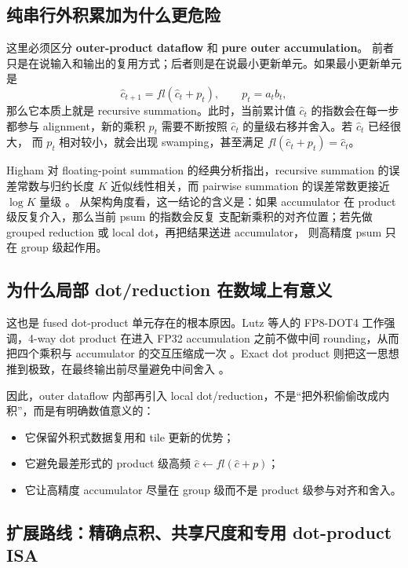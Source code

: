 \documentclass[UTF8,11pt,a4paper]{ctexart}
\begin{document}
\subsection{纯串行外积累加为什么更危险}

这里必须区分 \textbf{outer-product dataflow} 和 \textbf{pure outer accumulation}。
前者只是在说输入和输出的复用方式；后者则是在说最小更新单元。如果最小更新单元是
\begin{equation}
  \hat{c}_{t+1} = fl(\hat{c}_t + p_t), \qquad p_t = a_t b_t,
\end{equation}
那么它本质上就是 recursive summation。此时，当前累计值 $\hat{c}_t$ 的指数会在每一步都参与
alignment，新的乘积 $p_t$ 需要不断按照 $\hat{c}_t$ 的量级右移并舍入。若 $\hat{c}_t$ 已经很大，
而 $p_t$ 相对较小，就会出现 swamping，甚至满足 $fl(\hat{c}_t + p_t)=\hat{c}_t$。

Higham 对 floating-point summation 的经典分析指出，recursive summation 的误差常数与归约长度
$K$ 近似线性相关，而 pairwise summation 的误差常数更接近 $\log K$ 量级 \cite{higham}。
从架构角度看，这一结论的含义是：如果 accumulator 在 product 级反复介入，那么当前 psum 的指数会反复
支配新乘积的对齐位置；若先做 grouped reduction 或 local dot，再把结果送进 accumulator，
则高精度 psum 只在 group 级起作用。

\subsection{为什么局部 dot/reduction 在数域上有意义}

这也是 fused dot-product 单元存在的根本原因。Lutz 等人的 FP8-DOT4 工作强调，4-way dot product
在进入 FP32 accumulation 之前不做中间 rounding，从而把四个乘积与 accumulator 的交互压缩成一次
\cite{lutz2024}。Exact dot product 则把这一思想推到极致，在最终输出前尽量避免中间舍入 \cite{exactdot}。

因此，outer dataflow 内部再引入 local dot/reduction，不是“把外积偷偷改成内积”，而是有明确数值意义的：

\begin{itemize}
  \item 它保留外积式数据复用和 tile 更新的优势；
  \item 它避免最差形式的 product 级高频 $\hat{c}\leftarrow fl(\hat{c}+p)$；
  \item 它让高精度 accumulator 尽量在 group 级而不是 product 级参与对齐和舍入。
\end{itemize}

\subsection{扩展路线：精确点积、共享尺度和专用 dot-product ISA}
\end{document}
